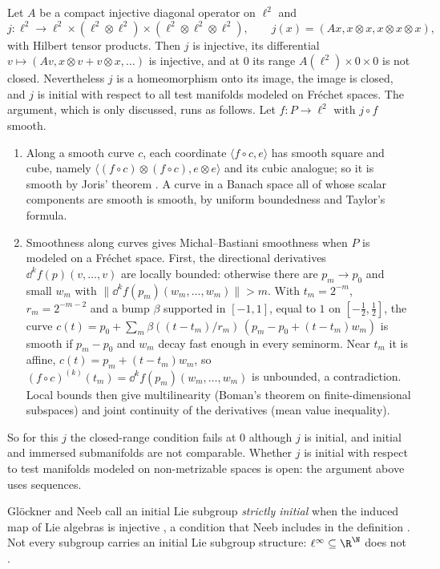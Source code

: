 \begin{remark}
  \label{rem:sub-initial-not-immersion}
  Let $A$ be a compact injective diagonal operator on $\ell^2$ and
  \[
    j \colon \ell^2 \to \ell^2 \times (\ell^2 \otimes \ell^2) \times
      (\ell^2 \otimes \ell^2 \otimes \ell^2), \qquad
    j(x) = (Ax, x \otimes x, x \otimes x \otimes x),
  \]
  with Hilbert tensor products. Then $j$ is injective, its differential
  $v \mapsto (Av, x \otimes v + v \otimes x, \dots)$ is injective, and at $0$ its range
  $A(\ell^2) \times 0 \times 0$ is not closed. Nevertheless $j$ is a homeomorphism onto its
  image, the image is closed, and $j$ is initial with respect to all test manifolds modeled on
  Fréchet spaces. The argument, which is only discussed, runs as follows. Let $f \colon P \to
  \ell^2$ with $j \circ f$ smooth.
  \begin{enumerate}
    \item Along a smooth curve $c$, each coordinate $\langle f \circ c, e\rangle$ has smooth
      square and cube, namely $\langle (f \circ c) \otimes (f \circ c), e \otimes e\rangle$ and
      its cubic analogue; so it is smooth by Joris' theorem \cite{Jor82}. A curve in a Banach
      space all of whose scalar components are smooth is smooth, by uniform boundedness and
      Taylor's formula.
    \item Smoothness along curves gives Michal--Bastiani smoothness when $P$ is modeled on a
      Fréchet space. First, the directional derivatives $\dd^k f(p)(v, \dots, v)$ are locally
      bounded: otherwise there are $p_m \to p_0$ and small $w_m$ with
      $\|\dd^k f(p_m)(w_m, \dots, w_m)\| > m$. With $t_m = 2^{-m}$, $r_m = 2^{-m-2}$ and a bump
      $\beta$ supported in $[-1,1]$, equal to $1$ on $[-\tfrac12, \tfrac12]$, the curve
      $c(t) = p_0 + \sum_m \beta((t - t_m)/r_m)\,(p_m - p_0 + (t - t_m)w_m)$ is smooth if
      $p_m - p_0$ and $w_m$ decay fast enough in every seminorm. Near $t_m$ it is affine,
      $c(t) = p_m + (t - t_m)w_m$, so $(f \circ c)^{(k)}(t_m) = \dd^k f(p_m)(w_m, \dots, w_m)$
      is unbounded, a contradiction. Local bounds then give multilinearity (Boman's theorem on
      finite-dimensional subspaces) and joint continuity of the derivatives (mean value
      inequality).
  \end{enumerate}
  So for this $j$ the closed-range condition fails at $0$ although $j$ is initial, and initial
  and immersed submanifolds are not comparable. Whether $j$ is initial with respect to test
  manifolds modeled on non-metrizable spaces is open: the argument above uses sequences.
\end{remark}

\begin{remark}
  \label{rem:sub-initial-lie}
  Glöckner and Neeb call an initial Lie subgroup \emph{strictly initial} when the induced map
  of Lie algebras is injective \cite[Def.~9.1.5]{GN26}, a condition that Neeb includes in the
  definition \cite{Nee06}. Not every subgroup carries an initial Lie subgroup structure:
  $\ell^\infty \subseteq \R^{\N}$ does not \cite[Ex.~9.1.8]{GN26}.
\end{remark}
